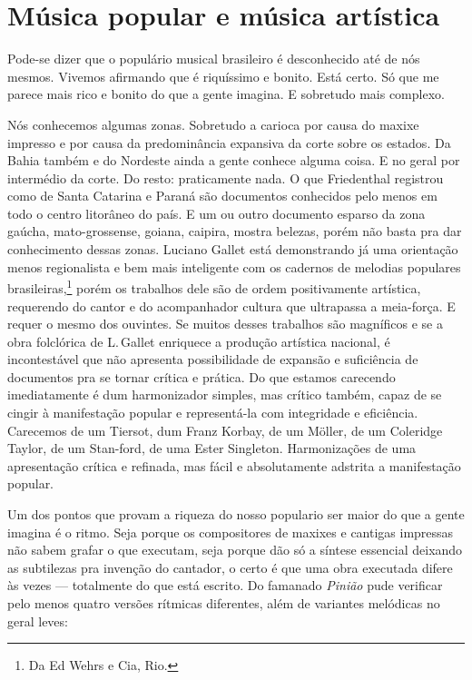 \section{Música popular e música artística}

Pode-se dizer que o populário musical brasileiro é desconhecido até de
nós mesmos. Vivemos afirmando que é riquíssimo e bonito. Está certo. Só
que me parece mais rico e bonito do que a gente imagina. E sobretudo
mais complexo.

Nós conhecemos algumas zonas. Sobretudo a carioca por causa do maxixe
impresso e por causa da predominância expansiva da corte sobre os
estados. Da Bahia também e do Nordeste ainda a gente conhece alguma
coisa. E no geral por intermédio da corte. Do resto: praticamente nada.
O que Friedenthal registrou como de Santa Catarina e Paraná são
documentos conhecidos pelo menos em todo o centro litorâneo do país. E
um ou outro documento esparso da zona gaúcha, mato-grossense, goiana,
caipira, mostra belezas, porém não basta pra dar conhecimento dessas
zonas. Luciano Gallet está demonstrando já uma orientação menos
regionalista e bem mais inteligente com os cadernos de melodias populares brasileiras,\footnote{Da Ed Wehrs e Cia, Rio.} porém os trabalhos dele são
de ordem positivamente artística, requerendo do cantor e do acompanhador
cultura que ultrapassa a meia-força. E requer o mesmo dos ouvintes. Se
muitos desses trabalhos são magníficos e se a obra folclórica de {L}.\,Gallet enriquece a produção artística nacional, é incontestável que não
apresenta possibilidade de expansão e suficiência de documentos pra se
tornar crítica e prática. Do que estamos carecendo imediatamente é dum
harmonizador simples, mas crítico também, capaz de se cingir à
manifestação popular e representá-la com integridade e eficiência.
Carecemos de um Tiersot, dum Franz Korbay, de um Möller, de um Coleridge
Taylor, de um Stan-ford, de uma Ester Singleton. Harmonizações de uma
apresentação crítica e refinada, mas fácil e absolutamente adstrita a
manifestação popular.

Um dos pontos que provam a riqueza do nosso populario ser maior do que a
gente imagina é o ritmo. Seja porque os compositores de maxixes e
cantigas impressas não sabem grafar o que executam, seja porque dão só a
síntese essencial deixando as subtilezas pra invenção do cantador, o
certo é que uma obra executada difere às vezes --- totalmente do que
está escrito. Do famanado \textit{Pinião} pude verificar pelo menos quatro
versões rítmicas diferentes, além de variantes melódicas no geral leves:

